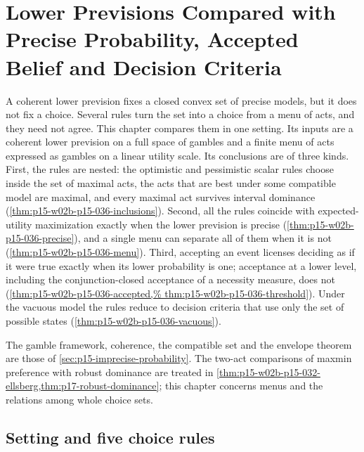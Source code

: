 \chapter{Lower Previsions Compared with Precise Probability, Accepted Belief and Decision Criteria}
\label{sec:p15-w02b-p15-036}

A coherent lower prevision fixes a closed convex set of precise models, but
it does not fix a choice. Several rules turn the set into a choice from a
menu of acts, and they need not agree. This chapter compares them in one
setting. Its inputs are a coherent lower prevision on a full space of
gambles and a finite menu of acts expressed as gambles on a linear utility
scale. Its conclusions are of three kinds. First, the rules are nested: the
optimistic and pessimistic scalar rules choose inside the set of maximal
acts, the acts that are best under some compatible model are maximal, and
every maximal act survives interval dominance
(\cref{thm:p15-w02b-p15-036-inclusions}). Second, all the rules coincide
with expected-utility maximization exactly when the lower prevision is
precise (\cref{thm:p15-w02b-p15-036-precise}), and a single menu can
separate all of them when it is not
(\cref{thm:p15-w02b-p15-036-menu}). Third, accepting an event licenses
deciding as if it were true exactly when its lower probability is one;
acceptance at a lower level, including the conjunction-closed acceptance of
a necessity measure, does not (\cref{thm:p15-w02b-p15-036-accepted,%
thm:p15-w02b-p15-036-threshold}). Under the vacuous model the rules reduce
to decision criteria that use only the set of possible states
(\cref{thm:p15-w02b-p15-036-vacuous}).

The gamble framework, coherence, the compatible set and the envelope
theorem are those of \cref{sec:p15-imprecise-probability}. The two-act
comparisons of maxmin preference with robust dominance are treated in
\cref{thm:p15-w02b-p15-032-ellsberg,thm:p17-robust-dominance}; this chapter
concerns menus and the relations among whole choice sets.

\section{Setting and five choice rules}
\label{sec:p15-w02b-p15-036-setting}

